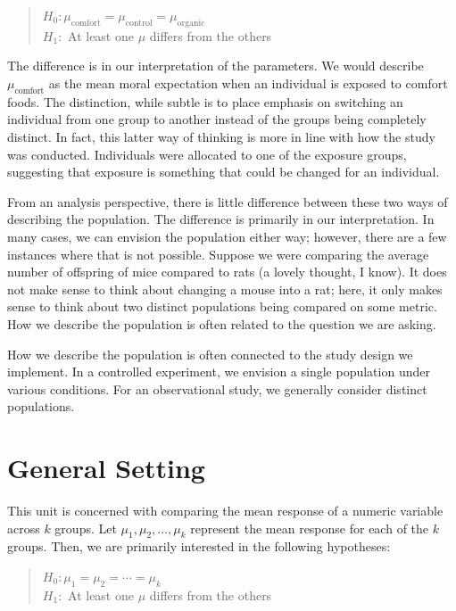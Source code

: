 \documentclass[
]{book}
\theoremstyle{plain}
\theoremstyle{mydefn}
\theoremstyle{myexmpl}
\theoremstyle{remark}
\begin{document}
\begin{quote}
\(H_0: \mu_{\text{comfort}} = \mu_{\text{control}} = \mu_{\text{organic}}\)\\
\(H_1:\) At least one \(\mu\) differs from the others
\end{quote}

The difference is in our interpretation of the parameters. We would describe \(\mu_{\text{comfort}}\) as the mean moral expectation when an individual is exposed to comfort foods. The distinction, while subtle is to place emphasis on switching an individual from one group to another instead of the groups being completely distinct. In fact, this latter way of thinking is more in line with how the study was conducted. Individuals were allocated to one of the exposure groups, suggesting that exposure is something that could be changed for an individual.

From an analysis perspective, there is little difference between these two ways of describing the population. The difference is primarily in our interpretation. In many cases, we can envision the population either way; however, there are a few instances where that is not possible. Suppose we were comparing the average number of offspring of mice compared to rats (a lovely thought, I know). It does not make sense to think about changing a mouse into a rat; here, it only makes sense to think about two distinct populations being compared on some metric. How we describe the population is often related to the question we are asking.

\begin{rmdtip}
How we describe the population is often connected to the study design we implement. In a controlled experiment, we envision a single population under various conditions. For an observational study, we generally consider distinct populations.
\end{rmdtip}

\hypertarget{general-setting}{%
\section{General Setting}\label{general-setting}}

This unit is concerned with comparing the mean response of a numeric variable across \(k\) groups. Let \(\mu_1, \mu_2, \dotsc, \mu_k\) represent the mean response for each of the \(k\) groups. Then, we are primarily interested in the following hypotheses:

\begin{quote}
\(H_0: \mu_1 = \mu_2 = \dotsb = \mu_k\)\\
\(H_1:\) At least one \(\mu\) differs from the others
\end{quote}
\end{document}
